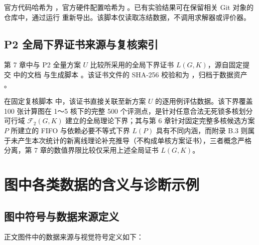 \documentclass[anonymous,notoc]{gmcm2026}
\begin{document}
官方代码哈希为 \texttt{}，官方硬件配置哈希为 \texttt{}。已有实验结果可在保留相关 Git 对象的仓库中，通过运行 \texttt{} 重新导出。该脚本仅读取冻结数据，不调用求解器或评价器。

\subsection{P2 全局下界证书来源与复核索引}

第 7 章中与 P2 全量方案 \(U\) 比较所采用的全局下界证书 \(L(G, K)\)，源自固定提交 \texttt{} 中的文档 \texttt{} 与生成脚本 \texttt{}。该证书文件的 SHA-256 校验和为 \texttt{}，归档于数据资产 \texttt{}。

在固定复核脚本 \texttt{} 中，该证书直接关联至新方案 \(U\) 的逐用例评估数据。该下界覆盖 100 张计算图在 1～5 核下的完整 500 个评测点，是针对任意合法无死锁多核划分可行域 \(\mathcal{F}_2(G, K)\) 建立的全局理论下界；其与第 6 章针对固定完整多核候选方案 \(P\) 所建立的 FIFO 与依赖必要不等式下界 \(L(P)\) 具有不同内涵，而附录 B.3 则属于未产生本次统计的新离线理论补充推导（不构成单核方案证书），三者概念严格分离，第 7 章的数值界限比较仅采用上述全局证书 \(L(G, K)\)。

\FloatBarrier
\section{图中各类数据的含义与诊断示例}

\subsection{图中符号与数据来源定义}

正文图件中的数据来源与视觉符号定义如下：
\end{document}
